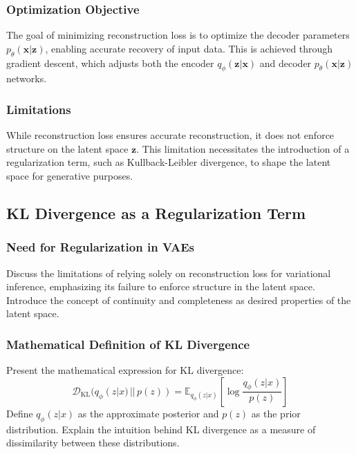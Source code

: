 \documentclass[a4paper,12pt]{article}
\begin{document}
\subsubsection{Optimization Objective}

The goal of minimizing reconstruction loss is to optimize the decoder parameters $p_{\theta}(\mathbf{x}|\mathbf{z})$, enabling accurate recovery of input data. This is achieved through gradient descent, which adjusts both the encoder $q_{\phi}(\mathbf{z}|\mathbf{x})$ and decoder $p_{\theta}(\mathbf{x}|\mathbf{z})$ networks.

\subsubsection{Limitations}

While reconstruction loss ensures accurate reconstruction, it does not enforce structure on the latent space $\mathbf{z}$. This limitation necessitates the introduction of a regularization term, such as Kullback-Leibler divergence, to shape the latent space for generative purposes.



\subsection{KL Divergence as a Regularization Term}

\subsubsection{Need for Regularization in VAEs}
Discuss the limitations of relying solely on reconstruction loss for variational inference, emphasizing its failure to enforce structure in the latent space. Introduce the concept of continuity and completeness as desired properties of the latent space.

\subsubsection{Mathematical Definition of KL Divergence}
Present the mathematical expression for KL divergence:
\begin{equation}
    \mathcal{D}_{\text{KL}}(q_{\phi}(z|x) \,||\, p(z)) = \mathbb{E}_{q_{\phi}(z|x)} \left[ \log \frac{q_{\phi}(z|x)}{p(z)} \right]
\end{equation}
Define \( q_{\phi}(z|x) \) as the approximate posterior and \( p(z) \) as the prior distribution. Explain the intuition behind KL divergence as a measure of dissimilarity between these distributions.
\end{document}

